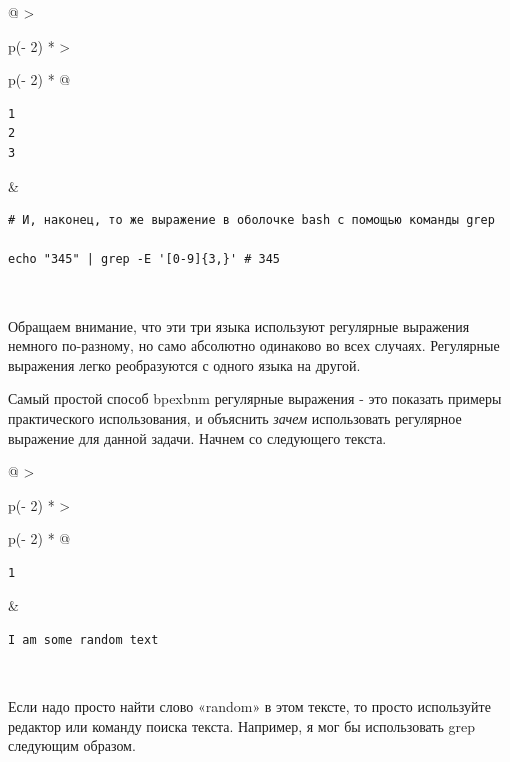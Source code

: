 \documentclass{report}
\begin{document}
\begin{longtable}[]{@{}
  >{\raggedright\arraybackslash}p{(\columnwidth - 2\tabcolsep) * }
  >{\raggedright\arraybackslash}p{(\columnwidth - 2\tabcolsep) * }@{}}
\toprule
\endhead
\begin{minipage}[t]{\linewidth}\raggedright
\begin{verbatim}
1
2
3
\end{verbatim}
\end{minipage} & \begin{minipage}[t]{\linewidth}\raggedright
\begin{verbatim}
# И, наконец, то же выражение в оболочке bash с помощью команды grep

echo "345" | grep -E '[0-9]{3,}' # 345
\end{verbatim}
\end{minipage} \\ \addlinespace
\bottomrule
\end{longtable}

Обращаем внимание, что эти три языка используют регулярные выражения
немного по-разному, но само абсолютно одинаково во всех случаях.
Регулярные выражения легко реобразуются с одного языка на другой.

Самый простой способ bpexbnm регулярные выражения - это показать примеры
практического использования, и объяснить \emph{зачем} использовать
регулярное выражение для данной задачи. Начнем со следующего текста.

\begin{longtable}[]{@{}
  >{\raggedright\arraybackslash}p{(\columnwidth - 2\tabcolsep) * }
  >{\raggedright\arraybackslash}p{(\columnwidth - 2\tabcolsep) * }@{}}
\toprule
\endhead
\begin{minipage}[t]{\linewidth}\raggedright
\begin{verbatim}
1
\end{verbatim}
\end{minipage} & \begin{minipage}[t]{\linewidth}\raggedright
\begin{verbatim}
I am some random text
\end{verbatim}
\end{minipage} \\ \addlinespace
\bottomrule
\end{longtable}

Если надо просто найти слово «random» в этом тексте, то просто
используйте редактор или команду поиска текста. Например, я мог бы
использовать grep следующим образом.
\end{document}
